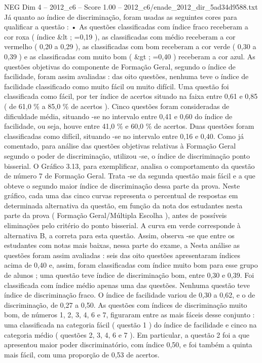 \begin{textsample}{NEG Dim 4 – 2012\_c6 – Score 1.00 – 2012\_c6/enade\_2012\_dir\_5ad34d9588.txt}
Já quanto ao índice de discriminação, foram usadas as seguintes cores para qualificar a questão : • As questões classificadas com índice fraco receberam a cor roxa ( índice \&lt ; =0,19 ), as classificadas com médio receberam a cor vermelho ( 0,20 a 0,29 ), as classificadas com bom receberam a cor verde ( 0,30 a 0,39 ) e as classificadas com muito bom ( \&gt ; =0,40 ) receberam a cor azul.
As questões objetivas do componente de Formação Geral, segundo o índice de facilidade, foram assim avaliadas : das oito questões, nenhuma teve o índice de facilidade classificado como muito fácil ou muito difícil.
Uma questão foi classificada como fácil, por ter índice de acertos situado na faixa entre 0,61 e 0,85 ( de 61,0 \% a 85,0 \% de acertos ).
Cinco questões foram consideradas de dificuldade média, situando -se no intervalo entre 0,41 e 0,60 do índice de facilidade, ou seja, houve entre 41,0 \% e 60,0 \% de acertos.
Duas questões foram classificadas como difícil, situando -se no intervalo entre 0,16 e 0,40.
Como já comentado, para análise das questões objetivas relativas à Formação Geral segundo o poder de discriminação, utilizou -se, o índice de discriminação ponto bisserial.
O Gráfico 3.13, para exemplificar, analisa o comportamento da questão de número 7 de Formação Geral.
Trata -se da segunda questão mais fácil e a que obteve o segundo maior índice de discriminação dessa parte da prova.
Neste gráfico, cada uma das cinco curvas representa o percentual de respostas em determinada alternativa da questão, em função da nota dos estudantes nesta parte da prova ( Formação Geral/Múltipla Escolha ), antes de possíveis eliminações pelo critério do ponto bisserial.
A curva em verde corresponde à alternativa B, a correta para esta questão.
Assim, observa -se que entre os estudantes com notas mais baixas, nessa parte do exame, a Nesta análise as questões foram assim avaliadas : seis das oito questões apresentaram índices acima de 0,40 e, assim, foram classificadas com índice muito bom para esse grupo de alunos ; uma questão teve índice de discriminação bom, entre 0,30 e 0,39.
Foi classificada com índice médio apenas uma das questões.
Nenhuma questão teve índice de discriminação fraco.
O índice de facilidade variou de 0,30 a 0,62, e o de discriminação, de 0,27 a 0,50.
As questões com índices de discriminação muito bom, de números 1, 2, 3, 4, 6 e 7, figuraram entre as mais fáceis desse conjunto : uma classificada na categoria fácil ( questão 1 ) do índice de facilidade e cinco na categoria médio ( questões 2, 3, 4, 6 e 7 ).
Em particular, a questão 2 foi a que apresentou maior poder discriminatório, com índice 0,50, e foi também a quinta mais fácil, com uma proporção de 0,53 de acertos.

\end{textsample}
